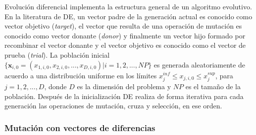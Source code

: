 Evolución diferencial implementa la estructura general de un algoritmo evolutivo.
%
En la literatura de DE, un vector padre de la generación actual es conocido como vector objetivo (\textit{target}), el vector que resulta de una operación de mutación es conocido como vector donante (\textit{donor}) y finalmente un vector hijo formado por recombinar el vector donante y el vector objetivo es conocido como el vector de prueba (\textit{trial}).
%
La población inicial $ \{ \boldsymbol{x}_{i,0} =  ( x_{1,i,0}, x_{2,i,0}, ..., x_{D,i,0}) | i = 1, 2, ..., NP \}$ es generada aleatoriamente de acuerdo a una distribución uniforme en los límites $x_j^{inf} \leq x_{j,i,0} \leq x_j^{sup} $, para $j=1,2, ..., D$, donde $D$ es la dimensión del problema y $NP$ es el tamaño de la población.
%
Después de la inicialización DE realiza de forma iterativa para cada generación las operaciones de mutación, cruza y selección, en ese orden.

\subsubsection*{Mutación con vectores de diferencias}

